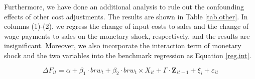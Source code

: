 Furthermore, we have done an additional analysis to rule out the confounding effects of other cost adjustments. The results are shown in Table \ref{tab.other}. In columns (1)-(2), we regress the change of input costs to sales and the change of wage payments to sales on the monetary shock, respectively, and the results are insignificant. Moreover, we also incorporate the interaction term of monetary shock and the two variables into the benchmark regression as Equation \ref{reg.int}. 

\begin{equation}
    \Delta F_{it} = \alpha +\beta_1 \cdot brw_{t} +\beta_2 \cdot brw_{t} \times X_{it}+ \Gamma \cdot \textbf{Z}_{it-1}+\xi_{i}+\varepsilon_{it} \label{reg.int}
\end{equation}

\begin{table}[htbp]
    \centering
    \caption{Discussion about other production costs}
\end{table}
